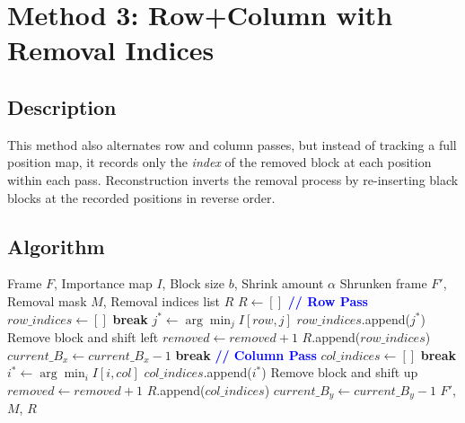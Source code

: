 \documentclass[11pt,a4paper]{article}
\begin{document}
\section{Method 3: Row+Column with Removal Indices}

\subsection{Description}
This method also alternates row and column passes, but instead of tracking a full position map, it records only the \emph{index} of the removed block at each position within each pass. Reconstruction inverts the removal process by re-inserting black blocks at the recorded positions in reverse order.

\subsection{Algorithm}

\begin{algorithm}[H]
\caption{Shrink Frame (Removal Indices)}
\begin{algorithmic}[1]
\Require Frame $F$, Importance map $I$, Block size $b$, Shrink amount $\alpha$
\Ensure Shrunken frame $F'$, Removal mask $M$, Removal indices list $R$
\State $R \gets []$ 
    \State \textcolor{blue}{\textbf{// Row Pass}}
    \State $row\_indices \gets []$
         \textbf{break} \EndIf
        \State $j^* \gets \arg\min_j I[row, j]$
        \State $row\_indices$.append($j^*$)
        \State Remove block and shift left
        \State $removed \gets removed + 1$
    \EndFor
     $R$.append($row\_indices$) \EndIf
     $current\_B_x \gets current\_B_x - 1$ \EndIf
     \textbf{break} \EndIf
    \State \textcolor{blue}{\textbf{// Column Pass}}
    \State $col\_indices \gets []$
         \textbf{break} \EndIf
        \State $i^* \gets \arg\min_i I[i, col]$
        \State $col\_indices$.append($i^*$)
        \State Remove block and shift up
        \State $removed \gets removed + 1$
    \EndFor
     $R$.append($col\_indices$) \EndIf
     $current\_B_y \gets current\_B_y - 1$ \EndIf
\EndWhile
\State \Return $F'$, $M$, $R$
\end{algorithmic}
\end{algorithm}
\end{document}
